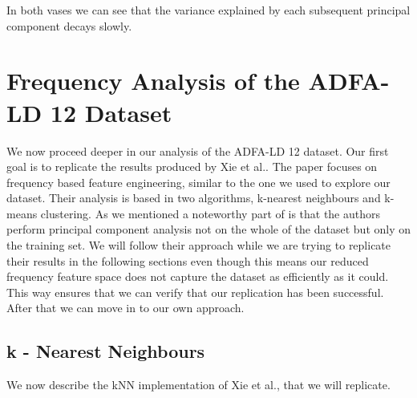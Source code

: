 \documentclass[reqno,openany,12pt]{amsbook}
\begin{document}
In both vases we can see that the variance explained by each subsequent principal component decays slowly.


\chapter{Frequency Analysis of the ADFA-LD 12 Dataset}

We now proceed deeper in our analysis of the ADFA-LD 12 dataset. Our first goal is to replicate the results produced by Xie et al.\cite{adf1}. The paper focuses on frequency based feature engineering, similar to the one we used to explore our dataset. Their analysis is based in two algorithms, k-nearest neighbours and k-means clustering. As we mentioned a noteworthy part of \cite{adf1} is that the authors perform principal component analysis not on the whole of the dataset but only on the training set.
We will follow their approach while we are trying to replicate their results in the following sections even though this means our reduced frequency feature space does not capture the dataset as efficiently as it could. This way ensures that we can verify that our replication has been successful. After that we can move in to our own approach.

\section{k - Nearest Neighbours}

We now describe the kNN implementation of Xie et al.\cite{adf1}, that we will replicate. 
\end{document}
